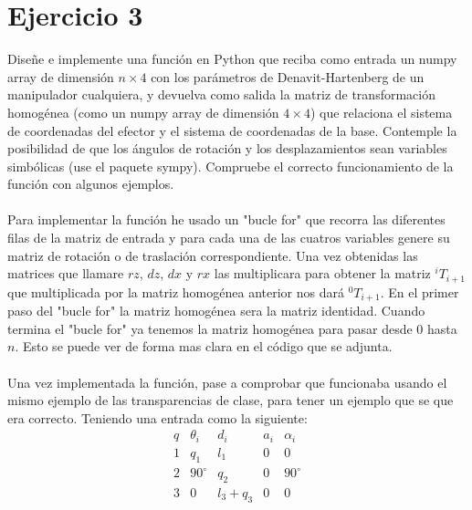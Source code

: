 \documentclass[12pt,a4paper]{report}
\begin{document}
\section*{Ejercicio 3}
Diseñe e implemente una función en Python que reciba como entrada un numpy array de dimensión $n \times 4$ con los parámetros de Denavit-Hartenberg de un
manipulador cualquiera, y devuelva como salida la matriz de transformación
homogénea (como un numpy array de dimensión $4 \times 4$) que relaciona el sistema
de coordenadas del efector y el sistema de coordenadas de la base. Contemple la posibilidad de que los ángulos de rotación y los desplazamientos sean variables
simbólicas (use el paquete sympy). Compruebe el correcto funcionamiento de
 la función con algunos ejemplos.\\\\
Para implementar la función he usado un "bucle for" que recorra las diferentes filas de la matriz de entrada y para cada una de las cuatros variables genere su matriz de rotación o de traslación correspondiente. Una vez obtenidas las matrices que llamare $rz$, $dz$, $dx$ y $rx$ las multiplicara para obtener la matriz $^{i}T_{i+1}$ que multiplicada por la matriz homogénea anterior nos dará  $^{0}T_{i+1}$. En el primer paso del "bucle for" la matriz homogénea sera la matriz identidad. Cuando termina el "bucle for" ya tenemos la matriz homogénea para pasar desde $0$ hasta $n$. Esto se puede ver de forma mas clara en el código que se adjunta.\\\\
Una vez implementada la función, pase a comprobar que funcionaba usando el mismo ejemplo de las transparencias de clase, para tener un ejemplo que se que era correcto.
Teniendo una entrada como la siguiente:
$$\begin{matrix}
\hline q & \theta_{i} & d_{i} & a_{i} & \alpha_{i}  \\
\hline 1 & q_{1} & l_{1} & 0 & 0 \\
2 & 90^{\circ} & q_{2} & 0 & 90^{\circ} \\
3 & 0 & l_{3}+q_{3} & 0 & 0
\end{matrix}
$$
\end{document}

